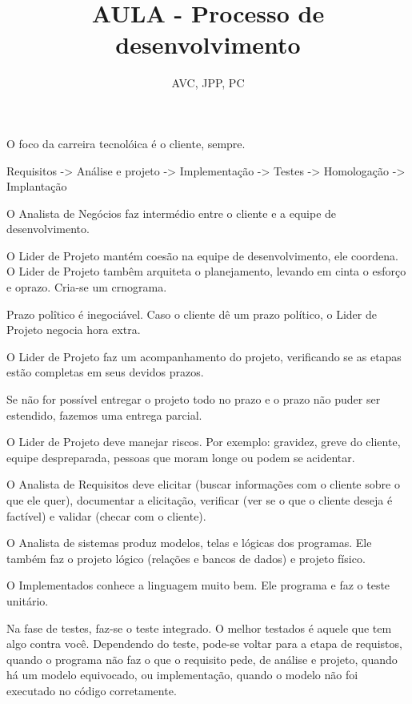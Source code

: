 \documentclass[
	12pt, %
]{fphw}
\title{AULA - Processo de desenvolvimento} %
\author{AVC, JPP, PC} %
\date{} %
\institute{Pontifícia Universidade Católica do Rio de Janeiro \\ Departamento de Informática} %
\begin{document}
\maketitle %

\begin{doublespace}
O foco da carreira tecnolóica é o cliente, sempre.

Requisitos -> Análise e projeto -> Implementação -> Testes -> Homologação -> Implantação

O Analista de Negócios faz intermédio entre o cliente e a equipe de desenvolvimento.

O Lider de Projeto mantém coesão na equipe de desenvolvimento, ele coordena. O Lider de Projeto tambêm arquiteta o planejamento, levando em cinta o esforço e oprazo. Cria-se um crnograma.

Prazo polîtico é inegociável. Caso o cliente dê um prazo político, o Lider de Projeto negocia hora extra. 

O Lider de Projeto faz um acompanhamento do projeto, verificando se as etapas estão completas em seus devidos prazos.

Se não for possível entregar o projeto todo no prazo e o prazo não puder ser estendido, fazemos uma entrega parcial.

O Lider de Projeto deve manejar riscos. Por exemplo: gravidez, greve do cliente, equipe despreparada, pessoas que moram longe ou podem se acidentar.

O Analista de Requisitos deve elicitar (buscar informações com o cliente sobre o que ele quer), documentar a elicitação, verificar (ver se o que o cliente deseja é factível) e validar (checar com o cliente).

O Analista de sistemas produz modelos, telas e lógicas dos programas. Ele também faz o projeto lógico (relações e bancos de dados) e projeto físico.

O Implementados conhece a linguagem muito bem. Ele programa e faz o teste unitário.

Na fase de testes, faz-se o teste integrado. O melhor testados é aquele que tem algo contra você. Dependendo do teste, pode-se voltar para a etapa de requistos, quando o programa não faz o que o requisito pede, de análise e projeto, quando há um modelo equivocado, ou implementação, quando o modelo não foi executado no código corretamente.


\end{doublespace}
\end{document}
